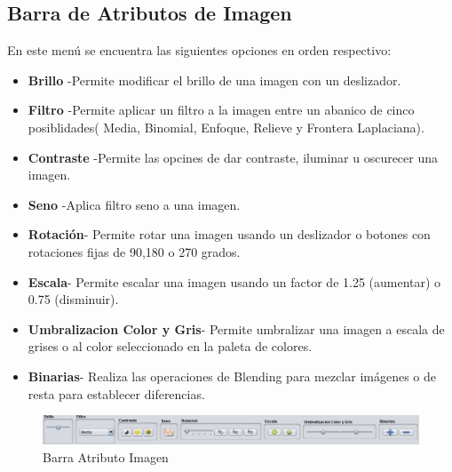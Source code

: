 \subsection{Barra de Atributos de Imagen}
En este menú se encuentra las siguientes opciones en orden respectivo:
\begin{itemize}
\item \textbf{Brillo} -Permite modificar el brillo de una imagen con un deslizador.
\item \textbf{Filtro} -Permite aplicar un filtro a la imagen entre un abanico de cinco posiblidades( Media, Binomial, Enfoque, Relieve y Frontera Laplaciana).
\item \textbf{Contraste} -Permite las opcines de dar contraste, iluminar u oscurecer una imagen.
\item \textbf{Seno} -Aplica filtro seno a una imagen.
\item \textbf{Rotación}- Permite rotar una imagen usando un deslizador o botones con rotaciones fijas de 90,180 o 270 grados.
\item \textbf{Escala}- Permite escalar una imagen usando un factor de 1.25 (aumentar) o 0.75 (disminuir).

\item \textbf{Umbralizacion Color y Gris}- Permite umbralizar una imagen a escala de grises o al color seleccionado en la paleta de colores.
\item \textbf{Binarias}- Realiza las operaciones de Blending para mezclar imágenes o de resta para establecer diferencias.
\end{itemize}

\begin{figure}[H]
  \centering
    \includegraphics[scale=0.40]{images/barraatributosimagen}
  \caption{Barra Atributo Imagen}
  \label{Barra Atributo Imagen}
\end{figure}

